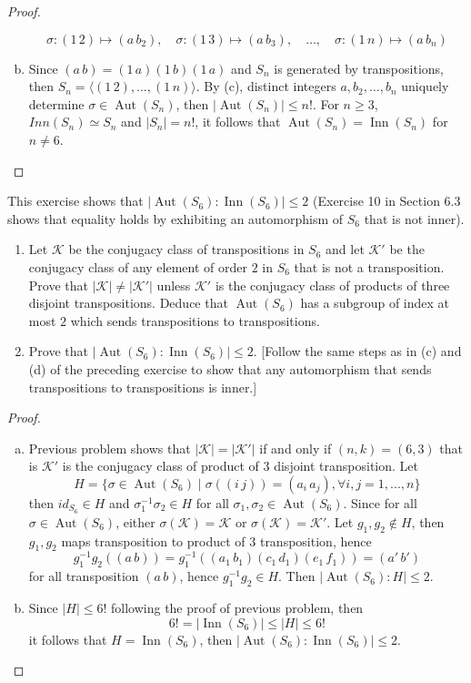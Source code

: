 \documentclass{article}
\newenvironment{problem}[2][Problem]{\begin{trivlist}
\item[\hskip \labelsep {\bfseries #1}\hskip \labelsep {\bfseries #2.}]}{\end{trivlist}}
\DeclareMathOperator{\Aut}{Aut}
\DeclareMathOperator{\Inn}{Inn}
\begin{document}
\begin{proof}
\begin{enumerate}[(a)]
    \[
        \sigma : (1 \, 2) \mapsto (a \, b_2), \quad \sigma : (1 \, 3) \mapsto (a \, b_3), \quad \dots, \quad \sigma : (1 \, n) \mapsto (a \, b_n)
    \]
    \item Since $(a\, b)=(1\, a)(1\, b)(1\, a)$ and $S_n$ is generated by transpositions, then $S_n =\langle (1\, 2), \dots , (1\, n)\rangle$. By (c), distinct integers $a, b_2, \dots, b_n$ uniquely determine $\sigma\in \Aut(S_n)$, then $|\Aut(S_n)|\leq n!$. For $n\geq 3$, $Inn(S_n) \simeq S_n$ and $|S_n|=n!$, it follows that $\Aut(S_n)=\Inn(S_n)$ for $n\neq 6$. 
\end{enumerate}
\end{proof}
\begin{problem}{19}
    This exercise shows that $|\operatorname{Aut}(S_6) : \operatorname{Inn}(S_6)| \leq 2$ (Exercise 10 in Section 6.3 shows that equality holds by exhibiting an automorphism of $S_6$ that is not inner).

\begin{enumerate}
    \item[(a)] Let $\mathcal{K}$ be the conjugacy class of transpositions in $S_6$ and let $\mathcal{K}'$ be the conjugacy class of any element of order $2$ in $S_6$ that is not a transposition. Prove that $|\mathcal{K}| \neq |\mathcal{K}'|$ unless $\mathcal{K}'$ is the conjugacy class of products of three disjoint transpositions. Deduce that $\operatorname{Aut}(S_6)$ has a subgroup of index at most $2$ which sends transpositions to transpositions.

    \item[(b)] Prove that $|\operatorname{Aut}(S_6) : \operatorname{Inn}(S_6)| \leq 2$. [Follow the same steps as in (c) and (d) of the preceding exercise to show that any automorphism that sends transpositions to transpositions is inner.]
\end{enumerate}
\end{problem}
\begin{proof}
    \begin{enumerate}[(a)]
        \item Previous problem shows that $|\mathcal{K}|=|\mathcal{K}'|$ if and only if $(n, k)=(6, 3)$ that is $\mathcal{K}'$ is the conjugacy class of product of $3$ disjoint transposition. Let 
        \[
        H=\{\sigma \in \Aut(S_6)\mid \sigma((i\, j))=(a_i\, a_j), \forall i, j =1, ..., n\}
        \]
        then $id_{S_6}\in H$ and $\sigma^{-1}_1\sigma_2\in H$ for all $\sigma_1, \sigma_2\in \Aut(S_6)$. Since for all $\sigma\in \Aut(S_6)$, either $\sigma(\mathcal{K})=\mathcal{K}$ or $\sigma(\mathcal{K})=\mathcal{K}'$. Let $g_1, g_2\notin H$, then $g_1, g_2$ maps transposition to product of 3 transposition, hence
        \[
            g_1^{-1}g_2((a\, b))=g_1^{-1}((a_1\, b_1)(c_1\, d_1)(e_1\, f_1))=(a'\, b')
        \]
        for all transposition $(a\, b)$, hence $g_1^{-1}g_2\in H$. Then $|\Aut(S_6):H|\leq 2$.
        \item Since $|H|\leq 6!$ following the proof of previous problem, then 
        \[
            6!=|\Inn(S_6)|\leq |H|\leq 6!
        \]
        it follows that $H=\Inn(S_6)$, then $|\Aut(S_6):\Inn(S_6)|\leq 2$.
    \end{enumerate}
\end{proof}
\end{document}
